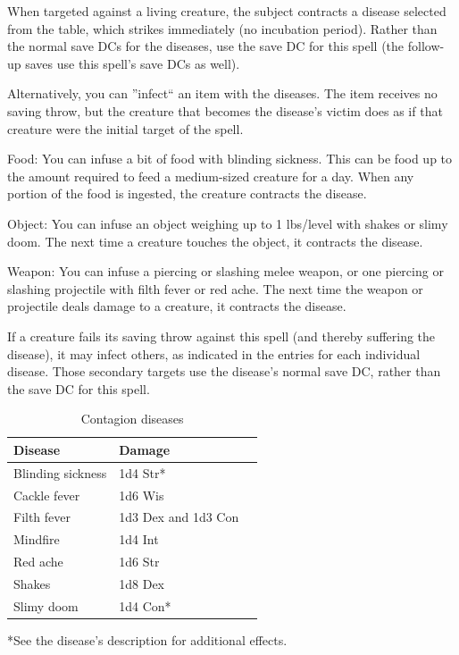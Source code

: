 When targeted against a living creature, the subject contracts a disease selected from the  table, which strikes immediately (no incubation period).
Rather than the normal save DCs for the diseases, use the save DC for this spell (the follow-up saves use this spell's save DCs as well). 

Alternatively, you can ''infect`` an item with the diseases.
The item receives no saving throw, but the creature that becomes the disease's victim
does as if that creature were the initial target of the spell.
\begin{list}{}{\leftmargin=1em}
 \item Food: You can infuse a bit of food with blinding sickness. 
 This can be food up to the amount required to feed a medium-sized creature for a day.
 When any portion of the food is ingested, the creature contracts the disease.
 \item Object: You can infuse an object weighing up to 1 lbs/level 
 with shakes or slimy doom.
 The next time a creature touches the object, it contracts the disease.
 \item Weapon: You can infuse a piercing or slashing melee weapon, or one piercing or slashing
 projectile with filth fever or red ache. The next time the weapon or projectile deals damage
 to a creature, it contracts the disease.
\end{list}
If a creature fails its saving throw against this spell (and thereby suffering the disease), it
may infect others, as indicated in the entries for each individual disease. 
Those secondary
targets use the disease's normal save DC, rather than the save DC for this spell.
\begin{table}
\label{tab:Contagion}
\caption{Contagion diseases}
\small
\centering
\begin{tabular}{|l|l|l|}
\hline
Disease&Damage\\ 
\hline
Blinding sickness&1d4 Str*\\ 
Cackle fever&1d6 Wis\\ 
Filth fever&1d3 Dex and 1d3 Con\\ 
Mindfire&1d4 Int\\ 
Red ache&1d6 Str\\ 
Shakes&1d8 Dex\\ 
Slimy doom&1d4 Con*\\ 
\hline
\end{tabular}

*See the disease's description for additional effects.\end{table}

